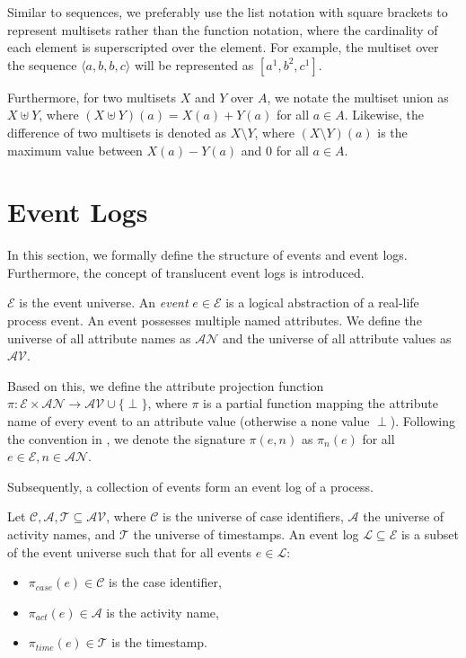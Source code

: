 Similar to sequences, we preferably use the list notation with square brackets to represent multisets rather than the function notation, where the cardinality of each element is superscripted over the element. For example, the multiset over the sequence $\langle a, b, b, c \rangle$ will be represented as $[a^1, b^2, c^1]$.

Furthermore, for two multisets $X$ and $Y$ over $A$, we notate the multiset union as $X \uplus Y$, where $(X \uplus Y)(a) = X(a) + Y(a)$ for all $a \in A$. Likewise, the difference of two multisets is denoted as $X \setminus Y$, where $(X \setminus Y)(a)$ is the maximum value between $X(a) - Y(a)$ and $0$ for all $a \in A$.

\section{Event Logs}

In this section, we formally define the structure of events and event logs. Furthermore, the concept of translucent event logs is introduced.

\begin{definition}[Event]
    $\mathcal{E}$ is the event universe. An \emph{event} $e \in \mathcal{E}$ is a logical abstraction of a real-life process event. An event possesses multiple named attributes. We define the universe of all attribute names as $\mathcal{AN}$ and the universe of all attribute values as $\mathcal{AV}$.  
\end{definition}

Based on this, we define the attribute projection function $\pi \colon \mathcal{E} \times \mathcal{AN} \rightarrow \mathcal{AV} \cup \{ \perp \}$, where $\pi$ is a partial function mapping the attribute name of every event to an attribute value (otherwise a none value $\perp$). Following the convention in \cite{bible}, we denote the signature $\pi(e, n)$ as $\pi_n(e)$ for all $e \in \mathcal{E}, n \in \mathcal{AN}$.

Subsequently, a collection of events form an event log of a process.

\begin{definition}
    Let $\mathcal{C, A, T} \subseteq \mathcal{AV}$, where $\mathcal{C}$ is the universe of case identifiers, $\mathcal{A}$ the universe of activity names, and $\mathcal{T}$ the universe of timestamps.  An event log $\mathcal{L} \subseteq \mathcal{E}$ is a subset of the event universe such that for all events $e \in \mathcal{L}$:
    
    \begin{itemize}
        \item $\pi_{case}(e) \in \mathcal{C}$ is the case identifier,
        \item $\pi_{act}(e) \in \mathcal{A}$ is the activity name,
        \item $\pi_{time}(e) \in \mathcal{T}$ is the timestamp.
    \end{itemize}
\end{definition}

